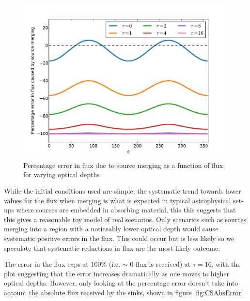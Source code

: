 \begin{figure} [H]
    \centering
    \includegraphics[width=\textwidth]{plots/CH4/CSError.pdf}
    \caption{Percentage error in flux due to source merging as a function of flux for varying optical depths}
    \label{fig:CSAngular}
\end{figure}

While the initial conditions used are simple, the systematic trend towards lower values for the flux when merging is what is expected in typical astrophysical set-ups where sources are embedded in absorbing material, this this suggests that this gives a reasonable toy model of real scenarios. Only scenarios such as sources merging into a region with a noticeably lower optical depth would cause systematic positive errors in the flux. This could occur but is less likely so we speculate that systematic reductions in flux are the most likely outcome.

The error in the flux caps at 100\% (i.e. $\sim$ 0 flux is received) at $\tau = 16$, with the plot suggesting that the error increases dramatically as one moves to higher optical depths. However, only looking at the percentage error doesn't take into account the absolute flux received by the sinks, shown in figure \ref{fig:CSAbsError}.


